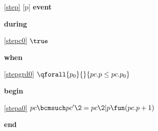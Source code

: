 \noindent \ref{step} [p] \textbf{event}
\begin{block}
  \item   \textbf{during}
  \begin{block}
  \item[ \eqref{stepc0} ]$\true$ %
  \end{block}
  \item   \textbf{when}
  \begin{block}
  \item[ \eqref{stepgrd0} ]$\qforall{p_0}{}{ pc.p \le pc.p_0 } $ %
  \end{block}
  \item   \textbf{begin}
  \begin{block}
  \item[ \eqref{stepa0} ]$pc \bcmsuch pc' \2= pc \2| p \fun (pc.p + 1) $ %
  \end{block}
  \item   \textbf{end} \\
\end{block}
